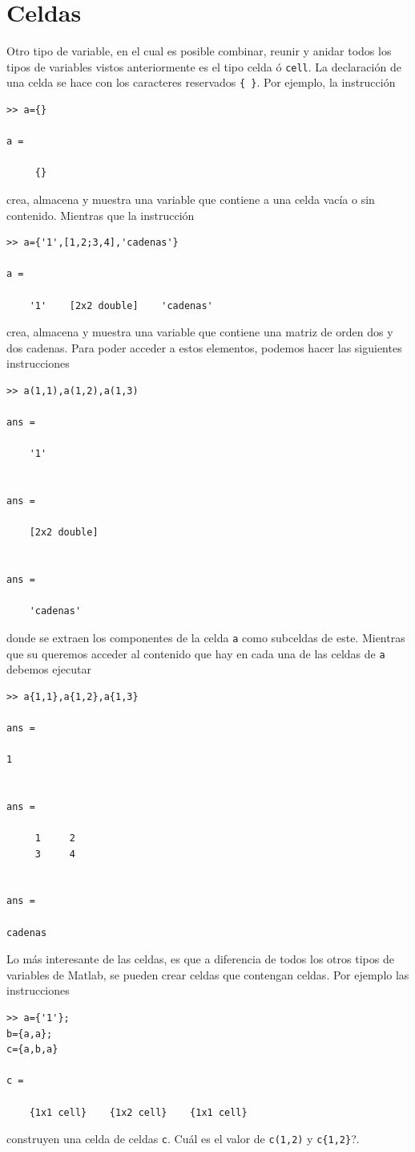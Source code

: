 \documentclass[11pt,legalpaper]{article}
\begin{document}
\section{Celdas}
Otro tipo de variable, en el cual es posible combinar, reunir y anidar todos los tipos de variables vistos anteriormente es el tipo celda ó \texttt{cell}. La declaraci\'on de una celda se hace con los caracteres reservados \texttt{\{ \}}. Por ejemplo, la instrucci\'on
\begin{verbatim}
>> a={}

a = 

     {}
\end{verbatim}
crea, almacena y muestra una variable que contiene a una celda vacía o sin contenido. Mientras que la instrucci\'on
\begin{verbatim}
>> a={'1',[1,2;3,4],'cadenas'}

a = 

    '1'    [2x2 double]    'cadenas'
\end{verbatim}
crea, almacena y muestra una variable que contiene una matriz de orden dos y dos cadenas. Para poder acceder a estos elementos, podemos hacer las siguientes instrucciones 
\begin{verbatim}
>> a(1,1),a(1,2),a(1,3)

ans = 

    '1'


ans = 

    [2x2 double]


ans = 

    'cadenas'
\end{verbatim}
donde se extraen los componentes de la celda \texttt{a} como subceldas de este. Mientras que su queremos acceder al contenido que hay en cada una de las celdas de \texttt{a} debemos ejecutar
\begin{verbatim}
>> a{1,1},a{1,2},a{1,3}

ans =

1


ans =

     1     2
     3     4


ans =

cadenas
\end{verbatim}
Lo más interesante de las celdas, es que a diferencia de todos los otros tipos de variables de Matlab, se pueden crear celdas que contengan celdas. Por ejemplo las instrucciones 
\begin{verbatim}
>> a={'1'};
b={a,a};
c={a,b,a}

c = 

    {1x1 cell}    {1x2 cell}    {1x1 cell}
\end{verbatim}
construyen una celda de celdas \texttt{c}. \textquestiondown Cu\'al es el valor de \texttt{c(1,2)} y \texttt{c\{1,2\}}?.
\end{document}
